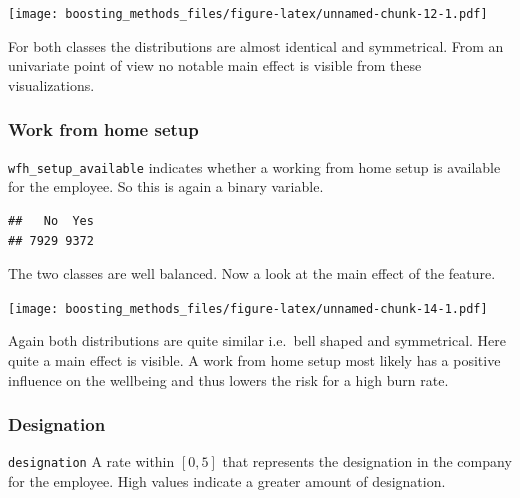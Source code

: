 \documentclass[
]{book}
\newenvironment{Shaded}{\begin{snugshade}}{\end{snugshade}}
\newcommand{\CommentTok}[1]{\textcolor[rgb]{0.56,0.35,0.01}{\textit{#1}}}
\newcommand{\FunctionTok}[1]{\textcolor[rgb]{0.00,0.00,0.00}{#1}}
\newcommand{\NormalTok}[1]{#1}
\newcommand{\SpecialCharTok}[1]{\textcolor[rgb]{0.00,0.00,0.00}{#1}}
\begin{document}
\texttt{[image: boosting\_methods\_files/figure-latex/unnamed-chunk-12-1.pdf]}

For both classes the distributions are almost identical and symmetrical. From an univariate point of view no notable main effect is visible from these visualizations.

\hypertarget{work-from-home-setup}{%
\subsubsection{Work from home setup}\label{work-from-home-setup}}

\texttt{wfh\_setup\_available} indicates whether a working from home setup is available for the employee. So this is again a binary variable.

\begin{Shaded}
\end{Shaded}

\begin{verbatim}
##   No  Yes 
## 7929 9372
\end{verbatim}

The two classes are well balanced. Now a look at the main effect of the feature.

\texttt{[image: boosting\_methods\_files/figure-latex/unnamed-chunk-14-1.pdf]}

Again both distributions are quite similar i.e.~bell shaped and symmetrical. Here quite a main effect is visible. A work from home setup most likely has a positive influence on the wellbeing and thus lowers the risk for a high burn rate.

\hypertarget{designation}{%
\subsubsection{Designation}\label{designation}}

\texttt{designation} A rate within \([0,5]\) that represents the designation in the company for the employee. High values indicate a greater amount of designation.

\begin{Shaded}
\end{Shaded}
\end{document}
